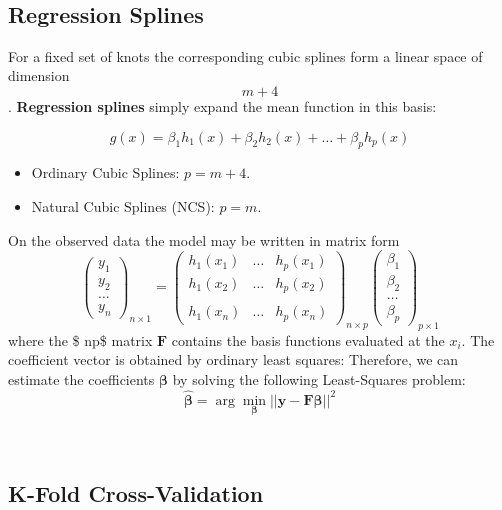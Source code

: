 \documentclass[
]{book}
\begin{document}
~

\subsection{Regression Splines}\label{regression-splines}

For a fixed set of knots the corresponding cubic splines form a linear space of dimension \[   m+4   \]. \textbf{Regression splines} simply expand the mean function in this basis:

\[g(x)=\beta_1 h_1(x)+\beta_2 h_2(x)+\ldots+\beta_p h_p(x)\]

\begin{itemize}
\item
  Ordinary Cubic Splines: \(p=m+4\).
\item
  Natural Cubic Splines (NCS): \(p=m\).
\end{itemize}

On the observed data the model may be written in matrix form
\[
      \begin{pmatrix}
        y_1\\
        y_2\\
        \ldots\\
        y_n
      \end{pmatrix}_{n\times 1} =
      \begin{pmatrix}
         h_1(x_1)& \ldots & h_{p}(x_1)\\
          h_1(x_2)& \ldots & h_{p}(x_2)\\
         \\
           h_1(x_n)& \ldots & h_{p}(x_n)
      \end{pmatrix}_{n\times p}
      \begin{pmatrix}
      \beta_1\\
      \beta_2\\
      \ldots\\
      \beta_p
      \end{pmatrix}_{p\times 1}
\]
where the \$ n\times p\$ matrix \(\mathbf{F}\) contains the basis functions evaluated at the \(x_i\). The coefficient vector is obtained by ordinary least squares:
Therefore, we can estimate the coefficients \(\mathbf{\beta}\) by solving the following Least-Squares problem:
\[\hat{\mathbf{\beta}}= \arg\min_{\mathbf{\beta}}||\mathbf{y} - \mathbf{F}{\mathbf{\beta}|}|^2\]

~

\subsection{K-Fold Cross-Validation}\label{k-fold-cross-validation}
\end{document}
